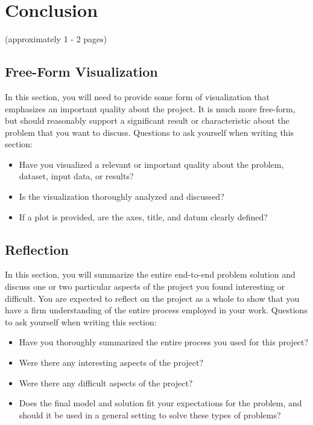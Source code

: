 \documentclass[twoside,openright,titlepage,numbers=noenddot,headinclude,%
               footinclude=true,cleardoublepage=empty,abstractoff,BCOR=5mm,%
               paper=a4,fontsize=11pt,ngerman,american]{scrreprt}
\numberwithin{theorem}{chapter}
\numberwithin{definition}{chapter}
\numberwithin{algorithm}{chapter}
\numberwithin{figure}{chapter}
\numberwithin{table}{chapter}
\numberwithin{equation}{chapter}
\begin{document}
\chapter*{Conclusion}
(approximately 1 - 2 pages)

\section*{Free-Form Visualization}
In this section, you will need to provide some form of visualization that emphasizes an important quality about the project. It is much more free-form, but should reasonably support a significant result or characteristic about the problem that you want to discuss. Questions to ask yourself when writing this section:
\begin{itemize}%
\item Have you visualized a relevant or important quality about the problem, dataset, input data, or results?
\item Is the visualization thoroughly analyzed and discussed?
\item If a plot is provided, are the axes, title, and datum clearly defined?
\end{itemize}


\section*{Reflection}
In this section, you will summarize the entire end-to-end problem solution and discuss one or two particular aspects of the project you found interesting or difficult. You are expected to reflect on the project as a whole to show that you have a firm understanding of the entire process employed in your work. Questions to ask yourself when writing this section:
\begin{itemize}%
\item Have you thoroughly summarized the entire process you used for this project?
\item Were there any interesting aspects of the project?
\item Were there any difficult aspects of the project?
\item Does the final model and solution fit your expectations for the problem, and should it be used in a general setting to solve these types of problems?
\end{itemize}
\end{document}
